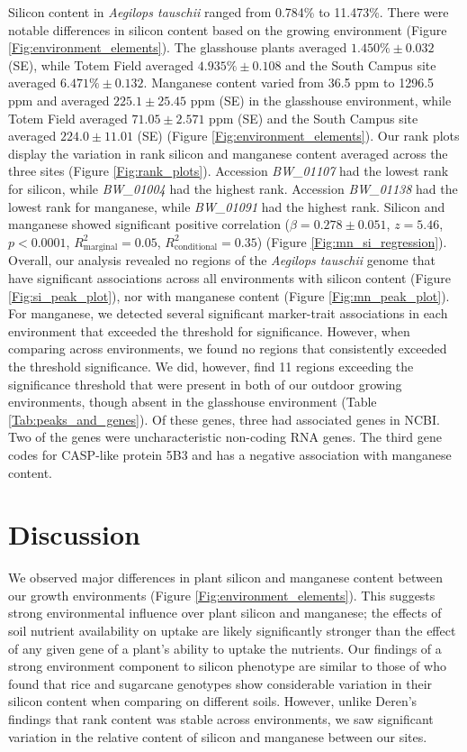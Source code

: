 \documentclass[12pt, letterpaper]{report}
\begin{document}
Silicon content in \textit{Aegilops tauschii} ranged from 0.784\% to 11.473\%. There were notable differences in silicon content based on the growing environment (Figure \ref{Fig:environment_elements}). The glasshouse plants averaged $1.450\% \pm 0.032$ (SE), while Totem Field averaged $4.935\% \pm 0.108$ and the South Campus site averaged $6.471\% \pm 0.132$. Manganese content varied from 36.5 ppm to 1296.5 ppm and averaged $225.1 \pm 25.45$ ppm (SE) in the glasshouse environment, while Totem Field averaged $71.05 \pm 2.571$ ppm (SE) and the South Campus site averaged $224.0 \pm 11.01$ (SE) (Figure \ref{Fig:environment_elements}). Our rank plots display the variation in rank silicon and manganese content averaged across the three sites (Figure \ref{Fig:rank_plots}). Accession \textit{BW\_01107} had the lowest rank for silicon, while \textit{BW\_01004} had the highest rank. Accession \textit{BW\_01138} had the lowest rank for manganese, while \textit{BW\_01091} had the highest rank. Silicon and manganese showed significant positive correlation ($\beta = 0.278 \pm 0.051$, $z = 5.46$, $p < 0.0001$, $R^2_{\text{marginal}} = 0.05$, $R^2_{\text{conditional}} = 0.35$) (Figure \ref{Fig:mn_si_regression}). Overall, our analysis revealed no regions of the \textit{Aegilops tauschii} genome that have significant associations across all environments with silicon content (Figure \ref{Fig:si_peak_plot}), nor with manganese content (Figure \ref{Fig:mn_peak_plot}). For manganese, we detected several significant marker-trait associations in each environment that exceeded the threshold for significance. However, when comparing across environments, we found no regions that consistently exceeded the threshold significance. We did, however, find 11 regions exceeding the significance threshold that were present in both of our outdoor growing environments, though absent in the glasshouse environment (Table \ref{Tab:peaks_and_genes}). Of these genes, three had associated genes in NCBI. Two of the genes were uncharacteristic non-coding RNA genes. The third gene codes for CASP-like protein 5B3 and has a negative association with manganese content.

\section{Discussion}

We observed major differences in plant silicon and manganese content between our growth environments (Figure \ref{Fig:environment_elements}). This suggests strong environmental influence over plant silicon and manganese; the effects of soil nutrient availability on uptake are likely significantly stronger than the effect of any given gene of a plant’s ability to uptake the nutrients. Our findings of a strong environment component to silicon phenotype are similar to those of \textcite{deren2001plant} who found that rice and sugarcane genotypes show considerable variation in their silicon content when comparing on different soils. However, unlike Deren’s findings that rank content was stable across environments, we saw significant variation in the relative content of silicon and manganese between our sites. 
\end{document}
